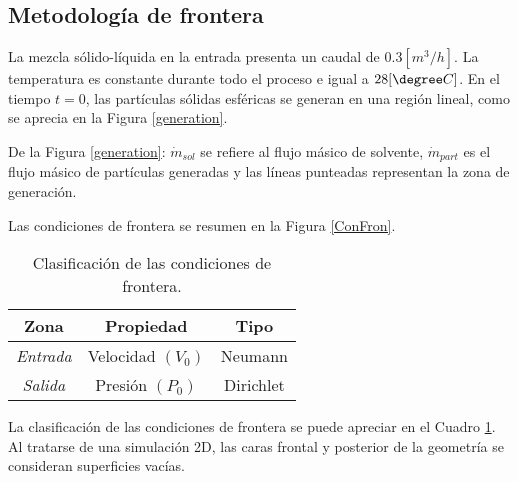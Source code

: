 \subsection{Metodolog\'ia de frontera} \label{CondF}

\noindent
\justify

La mezcla s\'olido-l\'iquida en la entrada presenta un caudal de $0.3 \left[m^3 /h \right]$. La temperatura es constante durante todo el proceso e igual a $28 [\degree C]$. En el tiempo $t=0$, las part\'iculas s\'olidas esf\'ericas se generan en una regi\'on lineal, como se aprecia en la Figura \ref{generation}.



\noindent
\justify

De la Figura \ref{generation}: $\dot{m} _{sol}$ se refiere al flujo m\'asico de solvente, $\dot{m} _{part}$ es el flujo m\'asico de part\'iculas generadas y las l\'ineas punteadas representan la zona de generaci\'on.

\noindent
\justify

Las condiciones de frontera se resumen en la Figura \ref{ConFron}.



\begin{table}[h!]
	\centering
	\begin{tabular}{|c|c|c|}
		\hline
		\textbf{Zona} & \textbf{Propiedad}  & \textbf{Tipo} \\ \hline
		\textit{Entrada} & Velocidad $(V_0)$ & Neumann \\ \hline
		\textit{Salida} & Presi\'on $(P_0)$ & Dirichlet \\ \hline
	\end{tabular}
	\caption{Clasificaci\'on de las condiciones de frontera.}
	\label{CFT}
\end{table}

\noindent
\justify

La clasificaci\'on de las condiciones de frontera se puede apreciar en el Cuadro \ref{CFT}. Al tratarse de una simulaci\'on 2D, las caras frontal y posterior de la geometr\'ia se consideran superficies vac\'ias.